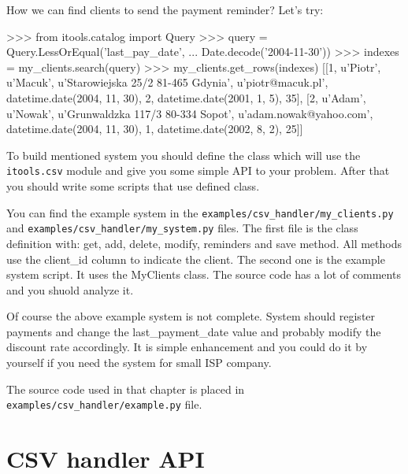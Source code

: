 \documentclass[a4paper]{book}
\begin{document}
How we can find clients to send the payment reminder? Let's try:
\begin{code}
    >>> from itools.catalog import Query
    >>> query = Query.LessOrEqual('last_pay_date', 
    ...                           Date.decode('2004-11-30'))
    >>> indexes = my_clients.search(query)
    >>> my_clients.get_rows(indexes)
    [[1, u'Piotr', u'Macuk', u'Starowiejska 25/2 81-465 Gdynia', 
    u'piotr@macuk.pl', datetime.date(2004, 11, 30), 2, 
    datetime.date(2001, 1, 5), 35], [2, u'Adam', u'Nowak', 
    u'Grunwaldzka 117/3 80-334 Sopot', u'adam.nowak@yahoo.com', 
    datetime.date(2004, 11, 30), 1, datetime.date(2002, 8, 2), 25]]
\end{code}

To build mentioned system you should define the class which will use the
{\tt itools.csv} module and give you some simple API to your problem. After
that you should write some scripts that use defined class.

You can find the example system in the 
{\tt examples/csv\_handler/my\_clients.py} and 
{\tt examples/csv\_handler/my\_system.py} files. The first file is the class
definition with: get, add, delete, modify, reminders and save method. 
All methods use the client\_id column to indicate the client. The second one
is the example system script. It uses the MyClients class. 
The source code has a lot of comments and you shuold analyze it.

Of course the above example system is not complete. System should register
payments and change the last\_payment\_date value and probably modify 
the discount rate accordingly. It is simple enhancement and you could do it 
by yourself if you need the system for small ISP company.

The source code used in that chapter is placed in \\
{\tt examples/csv\_handler/example.py} file.


\section{CSV handler API}
\end{document}
